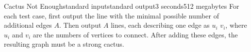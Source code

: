 \begin{problem}{Cactus Not Enough}{standard input}{standard output}{3 seconds}{512 megabytes}
\OutputFile
For each test case, first output the line with the minimal possible number of additional edges $A$. 
Then output $A$ lines, each describing one edge as $u_i$ $v_i$, where $u_i$ and $v_i$
are the numbers of vertices to connect. After adding these edges, the resulting graph must be a strong cactus.


\Example

\begin{example}
%
\end{example}

\end{problem}


